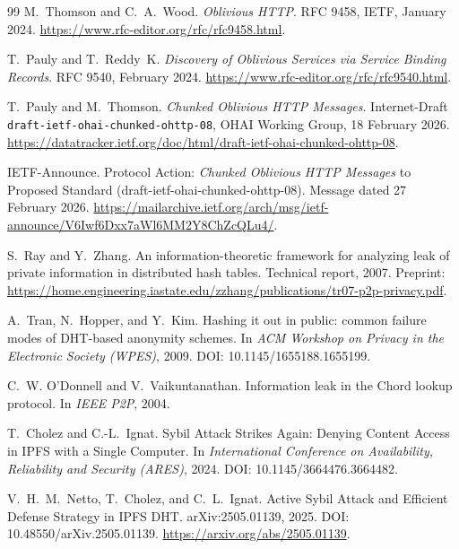 \documentclass[11pt]{article}
\begin{document}
\begin{thebibliography}{99}
M.~Thomson and C.~A.~Wood.
\newblock \emph{Oblivious HTTP}.
\newblock RFC 9458, IETF, January 2024.
\newblock \url{https://www.rfc-editor.org/rfc/rfc9458.html}.


T.~Pauly and T.~Reddy~K.
\newblock \emph{Discovery of Oblivious Services via Service Binding Records}.
\newblock RFC 9540, February 2024.
\newblock \url{https://www.rfc-editor.org/rfc/rfc9540.html}.

T.~Pauly and M.~Thomson.
\newblock \emph{Chunked Oblivious HTTP Messages}.
\newblock Internet-Draft \texttt{draft-ietf-ohai-chunked-ohttp-08}, OHAI Working Group, 18 February 2026.
\newblock \url{https://datatracker.ietf.org/doc/html/draft-ietf-ohai-chunked-ohttp-08}.



IETF-Announce.
\newblock Protocol Action: {\emph{Chunked Oblivious HTTP Messages}} to Proposed Standard (draft-ietf-ohai-chunked-ohttp-08).
\newblock Message dated 27 February 2026.
\newblock \url{https://mailarchive.ietf.org/arch/msg/ietf-announce/V6Iwf6Dxx7aWl6MM2Y8ChZcQLu4/}.

S.~Ray and Y.~Zhang.
\newblock An information-theoretic framework for analyzing leak of private information in distributed hash tables.
\newblock Technical report, 2007.
\newblock Preprint: \url{https://home.engineering.iastate.edu/zzhang/publications/tr07-p2p-privacy.pdf}.

A.~Tran, N.~Hopper, and Y.~Kim.
\newblock Hashing it out in public: common failure modes of DHT-based anonymity schemes.
\newblock In \emph{ACM Workshop on Privacy in the Electronic Society (WPES)}, 2009.
\newblock DOI: 10.1145/1655188.1655199.

C.~W. O'Donnell and V.~Vaikuntanathan.
\newblock Information leak in the Chord lookup protocol.
\newblock In \emph{IEEE P2P}, 2004.

T.~Cholez and C.-L.~Ignat.
\newblock Sybil Attack Strikes Again: Denying Content Access in {IPFS} with a Single Computer.
\newblock In \emph{International Conference on Availability, Reliability and Security (ARES)}, 2024.
\newblock DOI: 10.1145/3664476.3664482.

V.~H.~M.~Netto, T.~Cholez, and C.~L.~Ignat.
\newblock Active Sybil Attack and Efficient Defense Strategy in {IPFS} {DHT}.
\newblock arXiv:2505.01139, 2025. DOI: 10.48550/arXiv.2505.01139.
\newblock \url{https://arxiv.org/abs/2505.01139}.


\end{thebibliography}
\end{document}
